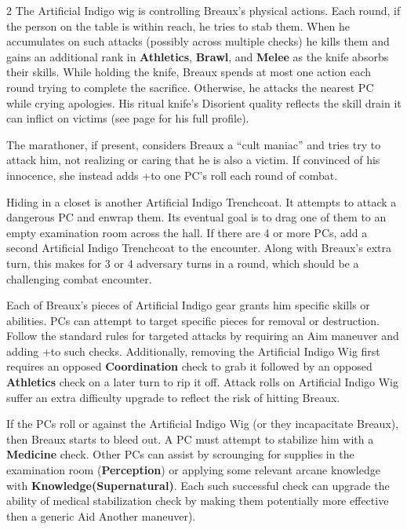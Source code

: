 \documentclass{book}
\newcommand{\df}{\DifficultyDie }
\newcommand{\stb}{\SetbackDie }
\newcommand{\bbb}{\BoostDie }
\newcommand{\ai}{{\color{cyan}Artificial Indigo}\xspace}
\begin{document}
\begin{multicols*}{2}
The \ai wig is controlling Breaux's physical actions.  Each round, if the person on the table is within reach, he tries to stab them.  When he accumulates  \Success\Success\Success {}on such attacks (possibly across multiple checks) he kills them and gains an additional rank in \textbf{Athletics}, \textbf{Brawl}, and \textbf{Melee} as the knife absorbs their skills.  While holding the knife, Breaux spends at most one action each round trying to complete the sacrifice.  Otherwise, he attacks the nearest PC while crying apologies.  His ritual knife's Disorient quality reflects the skill drain it can inflict on victims (see page \pageref{ad:breaux} for his full profile).

The marathoner, if present, considers Breaux a ``cult maniac'' and tries try to attack him, not realizing or caring that he is also a victim.  If convinced of his innocence, she instead adds +\bbb to one PC's roll each round of combat.

Hiding in a closet is another \ai Trenchcoat.  It attempts to attack a dangerous PC and enwrap them.  Its eventual goal is to drag one of them to an empty examination room across the hall.  If there are 4 or more PCs, add a second \ai Trenchcoat to the encounter.  Along with Breaux's extra turn, this makes for 3 or 4 adversary turns in a round, which should be a challenging combat encounter.

Each of Breaux's pieces of \ai gear grants him specific skills or abilities.  PCs can attempt to target specific pieces for removal or destruction.  Follow the standard rules for targeted attacks by requiring an Aim maneuver and adding +\stb\stb to such checks.  Additionally, removing the \ai Wig first requires an opposed \textbf{Coordination} check to grab it followed by an opposed \textbf{Athletics} check on a later turn to rip it off.  Attack rolls on \ai Wig suffer an extra difficulty upgrade to reflect the risk of hitting Breaux.

If the PCs roll \Despair { }or \Threat\Threat\Threat { }against the \ai Wig (or they incapacitate Breaux), then Breaux starts to bleed out.  A PC must attempt to stabilize him with a \df\df\df \textbf{Medicine} check.  Other PCs can assist by scrounging for supplies in the examination room (\df\df\bbb \textbf{Perception}) or applying some relevant arcane knowledge with \df\df \textbf{Knowledge(Supernatural)}.  Each such successful check can upgrade the ability of medical stabilization check by making them potentially more effective then a generic Aid Another maneuver).


\end{multicols*}
\end{document}
